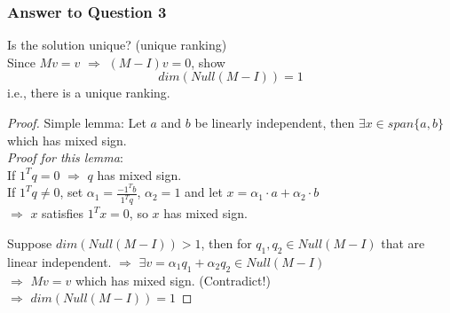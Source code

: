 \begin{multicols}{2}
\subsubsection{Answer to Question 3}
Is the solution unique? (unique ranking) \\
Since $Mv=v$ $\Longrightarrow$ $(M-I)v=0$, show 
\[
    dim(Null(M-I))=1
\]
i.e., there is a unique ranking.

\begin{proof}

    Simple lemma: Let $a$ and $b$ be linearly independent, then $\exists x\in span\{a,b\}$ which has mixed sign. \\
    \emph{Proof for this lemma}: \\
    If $1^Tq=0$ $\Longrightarrow$ $q$ has mixed sign. \\
    If $1^Tq\neq 0$, set $\alpha_1 = \frac{-1^Tb}{1^Tq}$, $\alpha_2=1$ and let $x=\alpha_1\cdot a+\alpha_2\cdot b$ \\
    $\Longrightarrow$ $x$ satisfies $1^Tx=0$, so $x$ has mixed sign.

    Suppose $dim(Null(M-I))>1$, then for $q_1,q_2\in Null(M-I)$ that are linear independent.
    $\Longrightarrow$ $\exists v= \alpha_1 q_1  + \alpha_2 q_2 \in Null(M-I)$ \\
    $\Longrightarrow$ $Mv=v$ which has mixed sign. (Contradict!) \\
    $\Longrightarrow$ $dim(Null(M-I))=1$
\end{proof}


\end{multicols}
